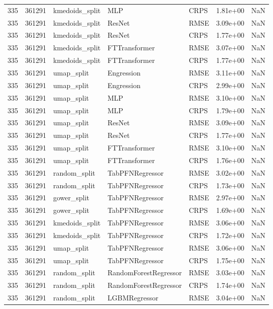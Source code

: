 \begin{tabular}{rrlllrr}
335 & 361291 & kmedoids\_split & MLP & CRPS & 1.81e+00 & NaN \\
335 & 361291 & kmedoids\_split & ResNet & RMSE & 3.09e+00 & NaN \\
335 & 361291 & kmedoids\_split & ResNet & CRPS & 1.77e+00 & NaN \\
335 & 361291 & kmedoids\_split & FTTransformer & RMSE & 3.07e+00 & NaN \\
335 & 361291 & kmedoids\_split & FTTransformer & CRPS & 1.77e+00 & NaN \\
335 & 361291 & umap\_split & Engression & RMSE & 3.11e+00 & NaN \\
335 & 361291 & umap\_split & Engression & CRPS & 2.99e+00 & NaN \\
335 & 361291 & umap\_split & MLP & RMSE & 3.10e+00 & NaN \\
335 & 361291 & umap\_split & MLP & CRPS & 1.79e+00 & NaN \\
335 & 361291 & umap\_split & ResNet & RMSE & 3.09e+00 & NaN \\
335 & 361291 & umap\_split & ResNet & CRPS & 1.77e+00 & NaN \\
335 & 361291 & umap\_split & FTTransformer & RMSE & 3.10e+00 & NaN \\
335 & 361291 & umap\_split & FTTransformer & CRPS & 1.76e+00 & NaN \\
335 & 361291 & random\_split & TabPFNRegressor & RMSE & 3.02e+00 & NaN \\
335 & 361291 & random\_split & TabPFNRegressor & CRPS & 1.73e+00 & NaN \\
335 & 361291 & gower\_split & TabPFNRegressor & RMSE & 2.97e+00 & NaN \\
335 & 361291 & gower\_split & TabPFNRegressor & CRPS & 1.69e+00 & NaN \\
335 & 361291 & kmedoids\_split & TabPFNRegressor & RMSE & 3.06e+00 & NaN \\
335 & 361291 & kmedoids\_split & TabPFNRegressor & CRPS & 1.72e+00 & NaN \\
335 & 361291 & umap\_split & TabPFNRegressor & RMSE & 3.06e+00 & NaN \\
335 & 361291 & umap\_split & TabPFNRegressor & CRPS & 1.75e+00 & NaN \\
335 & 361291 & random\_split & RandomForestRegressor & RMSE & 3.03e+00 & NaN \\
335 & 361291 & random\_split & RandomForestRegressor & CRPS & 1.74e+00 & NaN \\
335 & 361291 & random\_split & LGBMRegressor & RMSE & 3.04e+00 & NaN \\

\end{tabular}
